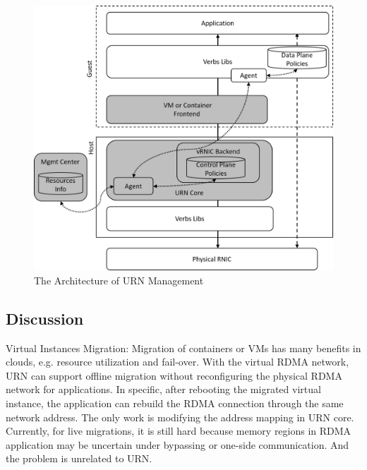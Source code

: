 \begin{figure}[!ht]
	\centering
	\includegraphics[width=1\linewidth]{images/urn-interface.png}
	\caption{The Architecture of URN Management}
	\label{fig:mgmt-center}
\end{figure}

\subsection{Discussion}

Virtual Instances Migration: Migration of containers or VMs has many benefits in clouds, e.g. resource utilization and fail-over. With the virtual RDMA network, URN can support offline migration without reconfiguring the physical RDMA network for applications. In specific, after rebooting the migrated virtual instance, the application can rebuild the RDMA connection through the same network address. The only work is modifying the address mapping in URN core. Currently, for live migrations, it is still hard because memory regions in RDMA application may be uncertain under bypassing or one-side communication. And the problem is unrelated to URN.

